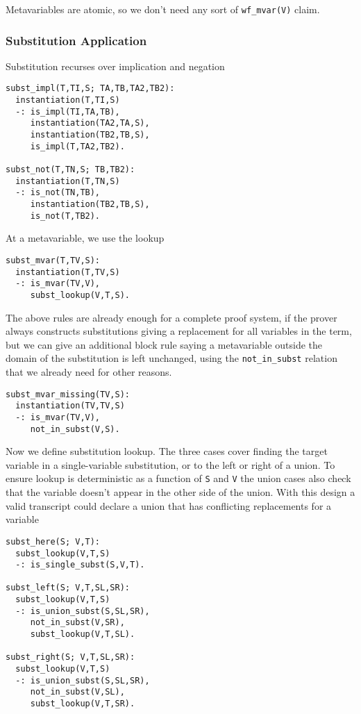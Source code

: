 \documentclass{article}
\theoremstyle{plain}
\theoremstyle{definition}
\begin{document}
Metavariables are atomic, so we don't need any sort of
\texttt{wf\_mvar(V)} claim.

\subsubsection{Substitution Application}\label{substitution-blocks}

Substitution recurses over implication and negation

\begin{verbatim}
subst_impl(T,TI,S; TA,TB,TA2,TB2):
  instantiation(T,TI,S)
  -: is_impl(TI,TA,TB),
     instantiation(TA2,TA,S),
     instantiation(TB2,TB,S),
     is_impl(T,TA2,TB2).

subst_not(T,TN,S; TB,TB2):
  instantiation(T,TN,S)
  -: is_not(TN,TB),
     instantiation(TB2,TB,S),
     is_not(T,TB2).
\end{verbatim}

At a metavariable, we use the lookup

\begin{verbatim}
subst_mvar(T,TV,S):
  instantiation(T,TV,S)
  -: is_mvar(TV,V),
     subst_lookup(V,T,S).
\end{verbatim}

The above rules are already enough for a complete proof system,
if the prover always constructs substitutions giving a replacement
for all variables in the term, but we can give an additional block rule
saying a metavariable outside the domain of the substitution is left
unchanged, using the \texttt{not\_in\_subst} relation that we already
need for other reasons.

\begin{verbatim}
subst_mvar_missing(TV,S):
  instantiation(TV,TV,S)
  -: is_mvar(TV,V),
     not_in_subst(V,S).
\end{verbatim}

Now we define substitution lookup.
The three cases cover finding the target variable in a
single-variable substitution, or to the left or right of
a union.
To ensure lookup is deterministic as a function of \texttt{S}
and \texttt{V} the union cases also check that the variable
doesn't appear in the other side of the union.
With this design a valid transcript could declare a union
that has conflicting replacements for a variable

\begin{verbatim}
subst_here(S; V,T):
  subst_lookup(V,T,S)
  -: is_single_subst(S,V,T).

subst_left(S; V,T,SL,SR):
  subst_lookup(V,T,S)
  -: is_union_subst(S,SL,SR),
     not_in_subst(V,SR),
     subst_lookup(V,T,SL).

subst_right(S; V,T,SL,SR):
  subst_lookup(V,T,S)
  -: is_union_subst(S,SL,SR),
     not_in_subst(V,SL),
     subst_lookup(V,T,SR).
\end{verbatim}
\end{document}

